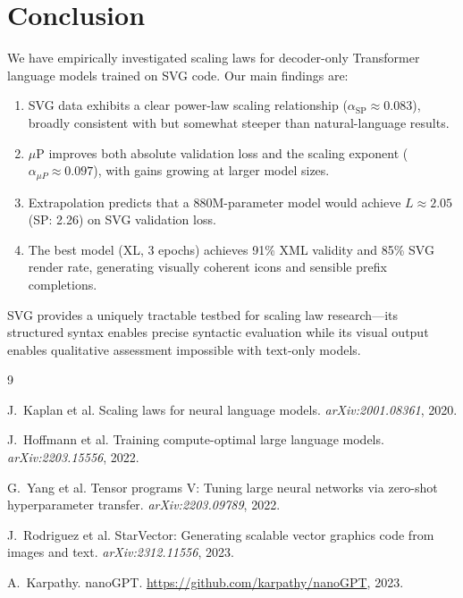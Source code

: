 \documentclass[11pt,letterpaper]{article}
\begin{document}
\section{Conclusion}

We have empirically investigated scaling laws for decoder-only Transformer language models
trained on SVG code. Our main findings are:

\begin{enumerate}[nosep]
  \item SVG data exhibits a clear power-law scaling relationship
        ($\alpha_{\text{SP}} \approx 0.083$), broadly consistent with but somewhat steeper
        than natural-language results.
  \item $\mu$P improves both absolute validation loss and the scaling exponent
        ($\alpha_{\mu P} \approx 0.097$), with gains growing at larger model sizes.
  \item Extrapolation predicts that a 880M-parameter model would achieve
        $L \approx 2.05$ (SP: 2.26) on SVG validation loss.
  \item The best model (XL, 3 epochs) achieves 91\% XML validity and 85\% SVG render rate,
        generating visually coherent icons and sensible prefix completions.
\end{enumerate}

SVG provides a uniquely tractable testbed for scaling law research---its structured syntax
enables precise syntactic evaluation while its visual output enables qualitative assessment
impossible with text-only models.


\begin{thebibliography}{9}

J.~Kaplan et al.
\newblock Scaling laws for neural language models.
\newblock \textit{arXiv:2001.08361}, 2020.

J.~Hoffmann et al.
\newblock Training compute-optimal large language models.
\newblock \textit{arXiv:2203.15556}, 2022.

G.~Yang et al.
\newblock Tensor programs V: Tuning large neural networks via zero-shot hyperparameter transfer.
\newblock \textit{arXiv:2203.09789}, 2022.

J.~Rodriguez et al.
\newblock StarVector: Generating scalable vector graphics code from images and text.
\newblock \textit{arXiv:2312.11556}, 2023.

A.~Karpathy.
\newblock nanoGPT.
\newblock \url{https://github.com/karpathy/nanoGPT}, 2023.

\end{thebibliography}
\end{document}
